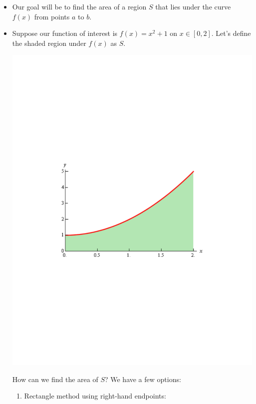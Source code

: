 \documentclass[11pt]{article}
\theoremstyle{definition}
\theoremstyle{remark}
\begin{document}
\begin{itemize}
\item Our goal will be to find the area of a region $S$ that lies under the curve $f(x)$ from points $a$ to $b$.
\item Suppose our function of interest is $f(x) = x^2 + 1$ on $x\in[0,2]$. Let's define the shaded region under $f(x)$ as $S$. \\
\begin{center}
\includegraphics[scale=0.5]{img/integrals_mainfunction.pdf}\\
\end{center}
How can we find the area of $S$? We have a few options:
\begin{enumerate}
\item Rectangle method using right-hand endpoints: \\
\begin{center}

\end{center}
\end{enumerate}
\end{itemize}
\end{document}
